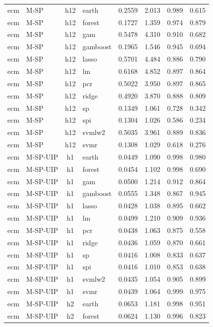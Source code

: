 \begin{ThreePartTable}
\begin{longtable}[t]{llclcccc}
\addlinespace
ecm & M-SP & h12 & earth & 0.2559 & 2.013 & 0.989 & 0.615\\
ecm & M-SP & h12 & forest & 0.1727 & 1.359 & 0.974 & 0.879\\
ecm & M-SP & h12 & gam & 0.5478 & 4.310 & 0.910 & 0.682\\
ecm & M-SP & h12 & gamboost & 0.1965 & 1.546 & 0.945 & 0.694\\
ecm & M-SP & h12 & lasso & 0.5701 & 4.484 & 0.886 & 0.790\\
ecm & M-SP & h12 & lm & 0.6168 & 4.852 & 0.897 & 0.864\\
ecm & M-SP & h12 & pcr & 0.5022 & 3.950 & 0.897 & 0.865\\
ecm & M-SP & h12 & ridge & 0.4920 & 3.870 & 0.888 & 0.809\\
ecm & M-SP & h12 & sp & 0.1349 & 1.061 & 0.728 & 0.342\\
ecm & M-SP & h12 & spi & 0.1304 & 1.026 & 0.586 & 0.234\\
ecm & M-SP & h12 & svmlw2 & 0.5035 & 3.961 & 0.889 & 0.836\\
ecm & M-SP & h12 & svmr & 0.1308 & 1.029 & 0.618 & 0.276\\
\addlinespace
ecm & M-SP-UIP & h1 & earth & 0.0449 & 1.090 & 0.998 & 0.980\\
ecm & M-SP-UIP & h1 & forest & 0.0454 & 1.102 & 0.998 & 0.690\\
ecm & M-SP-UIP & h1 & gam & 0.0500 & 1.214 & 0.912 & 0.864\\
ecm & M-SP-UIP & h1 & gamboost & 0.0555 & 1.348 & 0.867 & 0.945\\
ecm & M-SP-UIP & h1 & lasso & 0.0428 & 1.038 & 0.895 & 0.662\\
ecm & M-SP-UIP & h1 & lm & 0.0499 & 1.210 & 0.909 & 0.936\\
ecm & M-SP-UIP & h1 & pcr & 0.0438 & 1.063 & 0.875 & 0.558\\
ecm & M-SP-UIP & h1 & ridge & 0.0436 & 1.059 & 0.870 & 0.661\\
ecm & M-SP-UIP & h1 & sp & 0.0416 & 1.008 & 0.833 & 0.637\\
ecm & M-SP-UIP & h1 & spi & 0.0416 & 1.010 & 0.853 & 0.638\\
ecm & M-SP-UIP & h1 & svmlw2 & 0.0435 & 1.054 & 0.905 & 0.899\\
ecm & M-SP-UIP & h1 & svmr & 0.0439 & 1.064 & 0.999 & 0.975\\
\addlinespace
ecm & M-SP-UIP & h2 & earth & 0.0653 & 1.181 & 0.998 & 0.951\\
ecm & M-SP-UIP & h2 & forest & 0.0624 & 1.130 & 0.996 & 0.823\\

\end{longtable}
\end{ThreePartTable}
